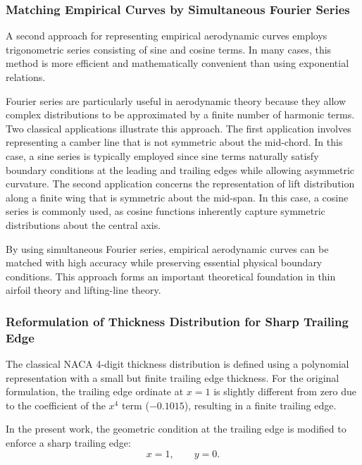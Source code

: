 
\subsubsection*{Matching Empirical Curves by Simultaneous Fourier Series}

A second approach for representing empirical aerodynamic curves employs trigonometric series consisting of sine and cosine terms. 
In many cases, this method is more efficient and mathematically convenient than using exponential relations.

Fourier series are particularly useful in aerodynamic theory because they allow complex distributions to be approximated by a finite number of harmonic terms. 
Two classical applications illustrate this approach.
The first application involves representing a camber line that is not symmetric about the mid-chord. 
In this case, 
a sine series is typically employed since sine terms naturally satisfy boundary conditions at the leading and trailing edges while allowing asymmetric curvature.
The second application concerns the representation of lift distribution along a finite wing that is symmetric about the mid-span. 
In this case, 
a cosine series is commonly used, as cosine functions inherently capture symmetric distributions about the central axis.

By using simultaneous Fourier series, 
empirical aerodynamic curves can be matched with high accuracy while preserving essential physical boundary conditions. 
This approach forms an important theoretical foundation in thin airfoil theory and lifting-line theory.


\subsubsection*{Reformulation of Thickness Distribution for Sharp Trailing Edge}

The classical NACA 4-digit thickness distribution is defined using
a polynomial representation with a small but finite trailing edge thickness.
For the original formulation, 
the trailing edge ordinate at $x=1$
is slightly different from zero due to the coefficient of the $x^4$ term
($-0.1015$), resulting in a finite trailing edge.

In the present work, the geometric condition at the trailing edge
is modified to enforce a sharp trailing edge:
\[
x = 1, \qquad y = 0.
\]

